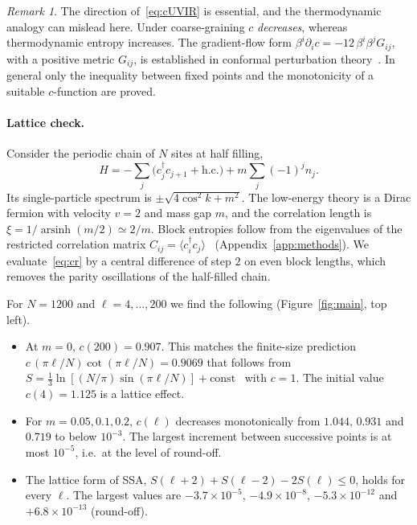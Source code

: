 \documentclass[11pt]{article}
\theoremstyle{remark}\newtheorem*{remark}{Remark}
\begin{document}
\begin{remark}
The direction of~\eqref{eq:cUVIR} is essential, and the thermodynamic analogy can mislead here. Under coarse-graining
$c$ \emph{decreases}, whereas thermodynamic entropy increases. The gradient-flow form
$\beta^i\partial_i c=-12\,\beta^i\beta^jG_{ij}$, with a positive metric $G_{ij}$, is established in conformal
perturbation theory~\cite{Zamolodchikov}. In general only the inequality between fixed points and the monotonicity
of a suitable $c$-function are proved.
\end{remark}

\paragraph{Lattice check.}
Consider the periodic chain of $N$ sites at half filling,
\begin{equation}
H=-\sum_j\bigl(c_j^\dagger c_{j+1}+\text{h.c.}\bigr)+m\sum_j(-1)^jn_j .
\label{eq:chain}
\end{equation}
Its single-particle spectrum is $\pm\sqrt{4\cos^2k+m^2}$. The low-energy theory is a Dirac fermion with velocity
$v=2$ and mass gap $m$, and the correlation length is $\xi=1/\operatorname{arsinh}(m/2)\simeq2/m$. Block
entropies follow from the eigenvalues of the restricted correlation matrix $C_{ij}=\langle c_i^\dagger
c_j\rangle$~\cite{Peschel} (Appendix~\ref{app:methods}). We evaluate~\eqref{eq:cr} by a central difference of step
$2$ on even block lengths, which removes the parity oscillations of the half-filled chain.

For $N=1200$ and $\ell=4,\dots,200$ we find the following (Figure~\ref{fig:main}, top left).
\begin{itemize}
\item At $m=0$, $c(200)=0.907$. This matches the finite-size prediction $c\,(\pi\ell/N)\cot(\pi\ell/N)=0.9069$ that
follows from $S=\tfrac13\ln[(N/\pi)\sin(\pi\ell/N)]+\text{const}$~\cite{CalabreseCardy} with $c=1$. The initial
value $c(4)=1.125$ is a lattice effect.
\item For $m=0.05,0.1,0.2$, $c(\ell)$ decreases monotonically from $1.044$, $0.931$ and $0.719$ to below $10^{-3}$.
The largest increment between successive points is at most $10^{-5}$, i.e.\ at the level of round-off.
\item The lattice form of SSA, $S(\ell+2)+S(\ell-2)-2S(\ell)\le0$, holds for every $\ell$. The largest values are
$-3.7\times10^{-5}$, $-4.9\times10^{-8}$, $-5.3\times10^{-12}$ and $+6.8\times10^{-13}$ (round-off).
\end{itemize}
\end{document}
